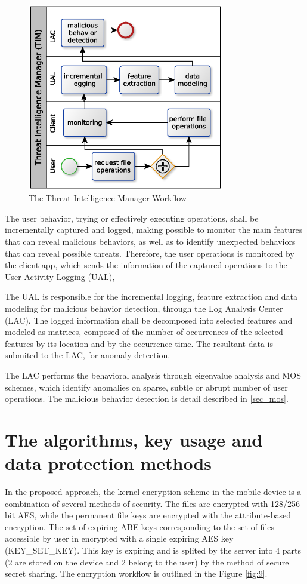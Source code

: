 \documentclass[twocolumn]{svjour3}          	%
\begin{document}
\begin{figure}[h!]
	\centering
	\includegraphics[width=8.6cm]{figures/mosworkflow.eps}
	\caption{The Threat Intelligence Manager Workflow}
	\label{fig:8}
\end{figure}

The user behavior, trying or effectively executing operations, shall be incrementally captured and logged, making possible to monitor the main features that can reveal malicious behaviors, as well as to identify unexpected behaviors that can reveal possible threats. Therefore, the user operations is monitored by the client app, which sends the information of the captured operations to the User Activity Logging (UAL), 

The UAL is responsible for the incremental logging, feature extraction and data modeling for malicious behavior detection, through the Log Analysis Center (LAC). The logged information shall be decomposed into selected features and modeled as matrices, composed of the number of occurrences of the selected features by its location and by the occurrence time. The resultant data is submited to the LAC, for anomaly detection.

The LAC performs the behavioral analysis through eigenvalue analysis and MOS schemes, which identify anomalies on sparse, subtle or abrupt number of user operations. The malicious behavior detection is detail described in \ref{sec_mos}.

\section{The algorithms, key usage and data protection methods}
\label{sec_algorithms}
In the proposed approach, the kernel encryption scheme in the mobile device is a combination of several methods of security. The files are encrypted with 128/256-bit AES, while the permanent file keys are encrypted with the attribute-based encryption. The set of expiring ABE keys corresponding to the set of files accessible by user in encrypted with a single expiring AES key (KEY\_SET\_KEY). This key is expiring and is splited by the server into 4 parts (2 are stored on the device and 2 belong to the user) by the method of secure secret sharing. The encryption workflow is outlined in the Figure \ref{fig:9}.
\end{document}
